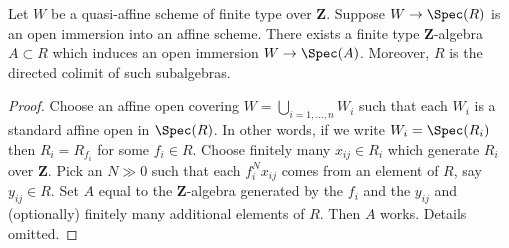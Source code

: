 \begin{lemma}
\label{lemma-quasi-affine-finite-type-over-Z}
Let $W$ be a quasi-affine scheme of finite type over
$\mathbf{Z}$. Suppose $W \to \Spec(R)$ is an
open immersion into an affine scheme. There exists a
finite type $\mathbf{Z}$-algebra $A \subset R$
which induces an open immersion $W \to \Spec(A)$.
Moreover, $R$ is the directed colimit of such subalgebras.
\end{lemma}

\begin{proof}
Choose an affine open covering $W = \bigcup_{i = 1, \ldots, n} W_i$
such that each $W_i$ is a standard affine open in $\Spec(R)$.
In other words, if we write $W_i = \Spec(R_i)$
then $R_i = R_{f_i}$ for some $f_i \in R$.
Choose finitely many $x_{ij} \in R_i$ which generate
$R_i$ over $\mathbf{Z}$.
Pick an $N \gg 0$ such that each $f_i^Nx_{ij}$ comes from an
element of $R$, say $y_{ij} \in R$.
Set $A$ equal to the $\mathbf{Z}$-algebra generated by
the $f_i$ and the $y_{ij}$ and (optionally) finitely many
additional elements of $R$. Then $A$ works. Details omitted.
\end{proof}
